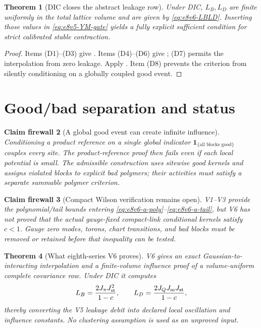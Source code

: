 \documentclass[11pt,oneside]{book}
\newtheorem{theorem}{Theorem}[chapter]
\newtheorem{firewall}[theorem]{Claim firewall}
\theoremstyle{definition}
\theoremstyle{remark}
\begin{document}
\begin{theorem}[DIC closes the abstract leakage row]
\label{thm:e8v6-card}
Under DIC, \(L_B,L_D\) are finite uniformly in the total lattice
volume and are given by \eqref{eq:e8v6-LBLD}.  Inserting those values
in \eqref{eq:e8v5-YM-gate} yields a fully explicit sufficient
condition for strict calibrated stable contraction.
\end{theorem}

\begin{proof}
Items (D1)--(D3) give
.  Items (D4)--(D6) give
; (D7) permits the interpolation
from zero leakage.  Apply .
Item (D8) prevents the criterion from silently conditioning on a
globally coupled good event.
\end{proof}

\section{Good/bad separation and status}
\label{sec:e8v6-status}

\begin{firewall}[A global good event can create infinite influence]
\label{fire:e8v6-good-event}
Conditioning a product reference on a single global indicator
\(\mathbf1_{\{\text{all blocks good}\}}\) couples every site.  The
product-reference proof then fails even if each local potential is
small.  The admissible construction uses sitewise good kernels and
assigns violated blocks to explicit bad polymers; their activities
must satisfy a separate summable polymer criterion.
\end{firewall}

\begin{firewall}[Compact Wilson verification remains open]
\label{fire:e8v6-Wilson}
V1--V3 provide the polynomial/tail bounds entering
\eqref{eq:e8v6-a-poly}--\eqref{eq:e8v6-a-tail}, but V6 has not proved
that the actual gauge-fixed compact-link conditional kernels satisfy
\(c<1\).  Gauge zero modes, torons, chart transitions, and bad blocks
must be removed or retained before that inequality can be tested.
\end{firewall}

\begin{theorem}[What eighth-series V6 proves]
\label{thm:e8v6-result}
V6 gives an exact Gaussian-to-interacting interpolation and a
finite-volume influence proof of a volume-uniform complete covariance
row.  Under DIC it computes
\[
 L_B=\frac{2J_\pi J_{\rm st}^2}{1-c},\qquad
 L_D=\frac{2J_QJ_{\rm m}J_{\rm st}}{1-c},
\]
thereby converting the V5 leakage debit into declared local
oscillation and influence constants.  No clustering assumption is
used as an unproved input.
\end{theorem}
\end{document}
